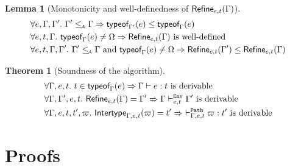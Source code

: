 \documentclass[a4paper]{article}
\theoremstyle{definition}
\newtheorem{theorem}{Theorem}
\newtheorem{lemma}{Lemma}
\begin{document}
  \begin{lemma}[Monotonicity and well-definedness of $\textsf{Refine}_{e,t}(\Gamma)$]
    \begin{align*}
      &\forall e,\Gamma,\Gamma'.\ \Gamma'\leq_{\!\scriptscriptstyle\mathcal{A}}\Gamma \Rightarrow \textsf{typeof}_{\Gamma'}(e) \leq \textsf{typeof}_{\Gamma}(e)\\
      &\forall e,t,\Gamma.\ \textsf{typeof}_{\Gamma}(e) \neq \Omega \Rightarrow \textsf{Refine}_{e,t}(\Gamma) \text{ is well-defined}\\
      &\forall e,t,\Gamma,\Gamma'.\ \Gamma'\leq_{\!\scriptscriptstyle\mathcal{A}}\Gamma \text{ and } \textsf{typeof}_{\Gamma}(e) \neq \Omega \Rightarrow \textsf{Refine}_{e,t}(\Gamma') \leq \textsf{Refine}_{e,t}(\Gamma)\\
    \end{align*}
  \end{lemma}


%

  \begin{theorem}[Soundness of the algorithm]
    \begin{align*}
      &\forall \Gamma, e, t.\ t\in\textsf{typeof}_{\Gamma}(e) \Rightarrow \Gamma \vdash e:t\text{ is derivable}\\
      &\forall \Gamma, \Gamma', e, t.\ \textsf{Refine}_{e,t}(\Gamma) = \Gamma' \Rightarrow \Gamma \vdash^{\texttt{Env}}_{e,t} \Gamma' \text{ is derivable}\\
      &\forall \Gamma, e, t, t', \varpi.\ \textsf{Intertype}_{\Gamma,e,t} (\varpi) = t' \Rightarrow\ \vdash^{\texttt{Path}}_{\Gamma,e,t} \varpi:t' \text{ is derivable}
    \end{align*}
  \end{theorem}

  \section{Proofs}
\end{document}
